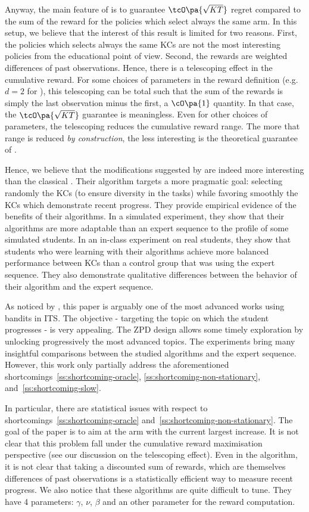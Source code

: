 Anyway, the main feature of \EXP is to guarantee $\tcO\pa{\sqrt{KT}}$ regret compared to the sum of the reward for the policies which select always the same arm. In this setup, we believe that the interest of this result is limited for two reasons. First, the policies which selects always the same KCs are not the most interesting policies from the educational point of view. Second, the rewards are weighted differences of past observations. Hence, there is a telescoping effect in the cumulative reward. For some choices of parameters in the reward definition (e.g. $d=2$ for \ZPDES), this telescoping can be total such that the sum of the rewards is simply the last observation minus the first, \ie a $\cO\pa{1}$ quantity. In that case, the $\tcO\pa{\sqrt{KT}}$ guarantee is meaningless. Even for other choices of parameters, the telescoping reduces the cumulative reward range. The more that range is reduced \emph{by construction}, the less interesting is the theoretical guarantee of \EXP.

Hence, we believe that the modifications suggested by \citet{clement2015multi} are indeed more interesting than the classical \EXP. Their algorithm targets a more pragmatic goal: selecting randomly the KCs (to ensure diversity in the tasks) while favoring smoothly the KCs which demonstrate recent progress. They provide empirical evidence of the benefits of their algorithms. In a simulated experiment, they show that their algorithms are more adaptable than an expert sequence to the profile of some simulated students. In an in-class experiment on real students, they show that students who were learning with their algorithms achieve more balanced performance between KCs than a control group that was using the expert sequence. They also demonstrate qualitative differences between the behavior of their algorithm and the expert sequence. 

As noticed by \citet{pikeburke2019phd}, this paper is arguably one of the most advanced works using bandits in ITS. The objective - targeting the topic on which the student progresses - is very appealing. The ZPD design allows some timely exploration by unlocking progressively the most advanced topics. The experiments bring many insightful comparisons between the studied algorithms and the expert sequence. However, this work only partially address the aforementioned shortcomings~\ref{ss:shortcoming-oracle}, \ref{ss:shortcoming-non-stationary}, and~\ref{ss:shortcoming-slow}.

In particular, there are statistical issues with respect to shortcomings~\ref{ss:shortcoming-oracle} and~\ref{ss:shortcoming-non-stationary}. The goal of the paper is to aim at the arm with the current largest increase. It is not clear that this problem fall under the cumulative reward maximisation perspective (see our discussion on the telescoping effect). Even in the algorithm, it is not clear that taking a discounted sum of rewards, which are themselves differences of past observations is a statistically efficient way to measure recent progress. We also notice that these algorithms are quite difficult to tune. They have 4 parameters: $\gamma$, $\nu$, $\beta$ and an other parameter for the reward computation.


